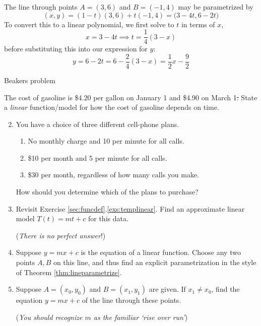 \begin{example}{}{}
	The line through points $A=(3,6)$ and $B=(-1,4)$ may be parametrized by
	\[
		(x,y)=(1-t)(3,6)+t(-1,4)=\bigl(3-4t,6-2t\bigr)
	\]
	To convert this to a linear polynomial, we first solve to $t$ in terms of $x$,
	\[
		x=3-4t\implies t=\frac 14(3-x)
	\]
	before substituting this into our expression for $y$:
	\[
		y=6-2t=6-\frac 24(3-x) =\frac 12x-\frac 92
	\]
\end{example}


\vfil

\pagebreak[4]


\begin{exercises}{}{}
	Beakers problem



	\exstart The cost of gasoline is \$4.20 per gallon on January 1\st{} and \$4.90 on March 1\st. State a \emph{linear} function/model for how the cost of gasoline depends on time.


	\begin{enumerate}\setcounter{enumi}{1}
	  \item You have a choice of three different cell-phone plans.
	  \begin{enumerate}
	    \item No monthly charge and 10\textcent{} per minute for all calls.
	    \item \$10 per month and 5\textcent{} per minute for all calls.
	    \item \$30 per month, regardless of how many calls you make.
	  \end{enumerate}
	  How should you determine which of the plans to purchase?
	  
	  
	  \item Revisit Exercise \ref*{sec:funcdef}.\ref{exs:templinear}. Find an approximate linear model $T(t)=mt+c$ for this data.\par
	  (\emph{There is no perfect answer}!)
    
    
    \item Suppose $y=mx+c$ is the equation of a linear function. Choose any two points $A,B$ on this line, and thus find an explicit parametrization in the style of Theorem \ref{thm:lineparametrize}.
    
    \item\label{exs:lineparam} Suppose $A=(x_0,y_0)$ and $B=(x_1,y_1)$ are given. If $x_1\neq x_0$, find the equation $y=mx+c$ of the line through these points.
    \par
    (\emph{You should recognize $m$ as the familiar `rise over run'})
    

\end{enumerate}
\end{exercises}
